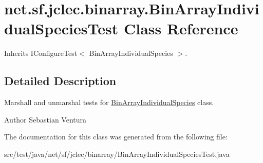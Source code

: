 \hypertarget{classnet_1_1sf_1_1jclec_1_1binarray_1_1_bin_array_individual_species_test}{\section{net.\-sf.\-jclec.\-binarray.\-Bin\-Array\-Individual\-Species\-Test Class Reference}
\label{classnet_1_1sf_1_1jclec_1_1binarray_1_1_bin_array_individual_species_test}
}


Inherits I\-Configure\-Test$<$ Bin\-Array\-Individual\-Species $>$.



\subsection{Detailed Description}
Marshall and unmarshal tests for \hyperlink{classnet_1_1sf_1_1jclec_1_1binarray_1_1_bin_array_individual_species}{Bin\-Array\-Individual\-Species} class.

\begin{DoxyAuthor}{Author}
Sebastian Ventura 
\end{DoxyAuthor}


The documentation for this class was generated from the following file\-:\begin{DoxyCompactItemize}
\item 
src/test/java/net/sf/jclec/binarray/Bin\-Array\-Individual\-Species\-Test.\-java\end{DoxyCompactItemize}
